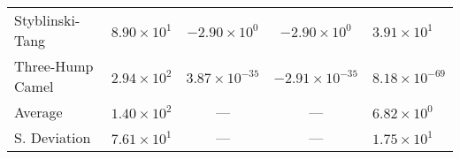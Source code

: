 \begin{longtable}{|l|r|c|c|l|}
    Styblinski-Tang &	$8.90 \times 10^{1}$ &	$-2.90 \times 10^{0}$ &	$-2.90 \times 10^{0}$ &	$3.91 \times 10^{1}$\\
    Three-Hump Camel &	$2.94 \times 10^{2}$ &	$3.87 \times 10^{-35}$ &	$-2.91 \times 10^{-35}$ &	$8.18 \times 10^{-69}$\\
    \hline 
    \hline
    Average &	$1.40 \times 10^{2}$ &	--- &	--- &	$6.82 \times 10^{0}$\\
    \hline
    S. Deviation &	$7.61 \times 10^{1}$ &	--- &	--- &	$1.75 \times 10^{1}$\\
\end{longtable}
